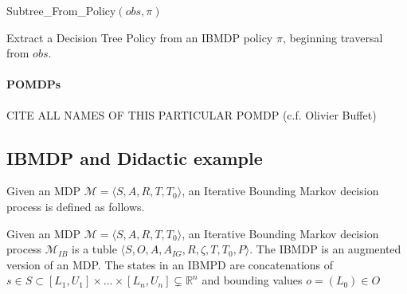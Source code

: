 \begin{algorithm}[t]
    
    
    
    \Return Subtree\_From\_Policy$(obs, \pi)$
    \caption{Extract a Decision Tree Policy from an IBMDP policy $\pi$, beginning traversal from $obs$.}\label{alg_extract_tree}
\end{algorithm}
\paragraph{POMDPs}
CITE ALL NAMES OF THIS PARTICULAR POMDP (c.f. Olivier Buffet)

\subsection{IBMDP and Didactic example}
Given an MDP $\mathcal{M}= \langle S, A, R, T, T_0 \rangle$, an Iterative Bounding Markov decision process is defined as follows.
\begin{definition}
    Given an MDP $\mathcal{M}= \langle S, A, R, T, T_0 \rangle$, an Iterative Bounding Markov decision process $\mathcal{M}_{IB}$ is a tuble $\langle S, O, A, A_{IG}, R, \zeta, T, T_0, P\rangle$.
    The IBMDP is an augmented version of an MDP. The states in an IBMPD are concatenations of $s\in S \subset [L_1, U_1]\times\dots \times [L_n, U_n] \subsetneq \mathbb{R}^n$ and bounding values $o = (L_0) \in O$ 
\end{definition}



